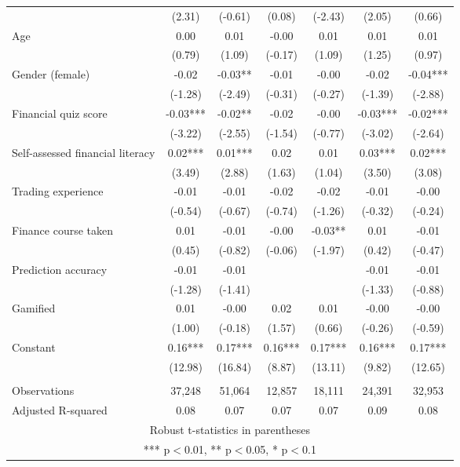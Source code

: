 \documentclass[]{article}
\begin{document}
\begin{tabular}{lcccccc}
 & (2.31) & (-0.61) & (0.08) & (-2.43) & (2.05) & (0.66) \\
Age & 0.00 & 0.01 & -0.00 & 0.01 & 0.01 & 0.01 \\
 & (0.79) & (1.09) & (-0.17) & (1.09) & (1.25) & (0.97) \\
Gender (female) & -0.02 & -0.03** & -0.01 & -0.00 & -0.02 & -0.04*** \\
 & (-1.28) & (-2.49) & (-0.31) & (-0.27) & (-1.39) & (-2.88) \\
Financial quiz score & -0.03*** & -0.02** & -0.02 & -0.00 & -0.03*** & -0.02*** \\
 & (-3.22) & (-2.55) & (-1.54) & (-0.77) & (-3.02) & (-2.64) \\
Self-assessed financial literacy & 0.02*** & 0.01*** & 0.02 & 0.01 & 0.03*** & 0.02*** \\
 & (3.49) & (2.88) & (1.63) & (1.04) & (3.50) & (3.08) \\
Trading experience & -0.01 & -0.01 & -0.02 & -0.02 & -0.01 & -0.00 \\
 & (-0.54) & (-0.67) & (-0.74) & (-1.26) & (-0.32) & (-0.24) \\
Finance course taken & 0.01 & -0.01 & -0.00 & -0.03** & 0.01 & -0.01 \\
 & (0.45) & (-0.82) & (-0.06) & (-1.97) & (0.42) & (-0.47) \\
Prediction accuracy & -0.01 & -0.01 &  &  & -0.01 & -0.01 \\
 & (-1.28) & (-1.41) &  &  & (-1.33) & (-0.88) \\
Gamified & 0.01 & -0.00 & 0.02 & 0.01 & -0.00 & -0.00 \\
 & (1.00) & (-0.18) & (1.57) & (0.66) & (-0.26) & (-0.59) \\
Constant & 0.16*** & 0.17*** & 0.16*** & 0.17*** & 0.16*** & 0.17*** \\
 & (12.98) & (16.84) & (8.87) & (13.11) & (9.82) & (12.65) \\
 &  &  &  &  &  &  \\
Observations & 37,248 & 51,064 & 12,857 & 18,111 & 24,391 & 32,953 \\
 Adjusted R-squared & 0.08 & 0.07 & 0.07 & 0.07 & 0.09 & 0.08 \\ \hline
\multicolumn{7}{c}{ Robust t-statistics in parentheses} \\
\multicolumn{7}{c}{ *** p$<$0.01, ** p$<$0.05, * p$<$0.1} \\
\end{tabular}
\end{document}
